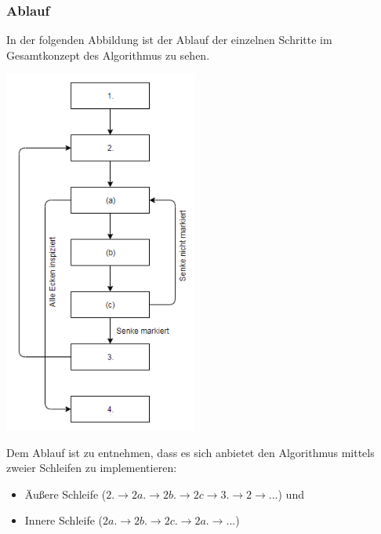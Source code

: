 \documentclass[11pt]{article}
\begin{document}
    \subsubsection{Ablauf}
    In der folgenden Abbildung ist der Ablauf der einzelnen Schritte im Gesamtkonzept des Algorithmus zu sehen.
    \begin{center}
        \includegraphics[height=12cm]{../fordfulkerson.PNG}
    \end{center}
    Dem Ablauf ist zu entnehmen, dass es sich anbietet den Algorithmus mittels zweier Schleifen zu implementieren:
    \begin{itemize}
        \item \"Au\ss{}ere Schleife ($2. \rightarrow 2a. \rightarrow 2b. \rightarrow 2c \rightarrow 3. \rightarrow 2 \rightarrow ...$) und
        \item Innere Schleife ($2a. \rightarrow 2b. \rightarrow 2c. \rightarrow 2a. \rightarrow ...$)
    \end{itemize}
\end{document}
